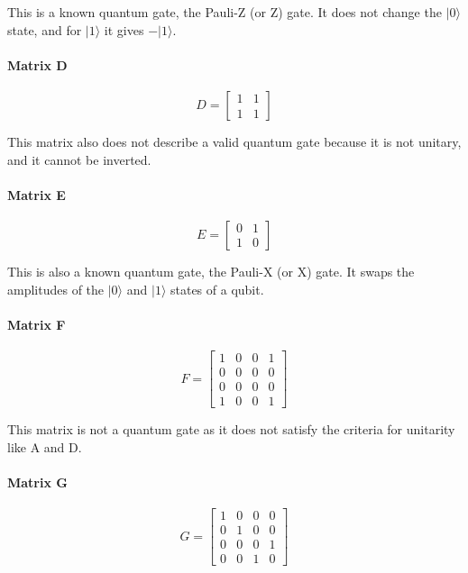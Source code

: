 \documentclass[12pt]{article}
\begin{document}
This is a known quantum gate, the Pauli-Z (or Z) gate. It does not change the $|0⟩$ state, and for $|1⟩$ it gives $-|1⟩$.

\paragraph*{Matrix D}

$$ D =
\begin{bmatrix}
    1 & 1 \\
    1 & 1
\end{bmatrix}
$$

This matrix also does not describe a valid quantum gate because it is not unitary, and it cannot be inverted.

\paragraph*{Matrix E}

$$ E =
\begin{bmatrix}
    0 & 1 \\
    1 & 0
\end{bmatrix}
$$

This is also a known quantum gate, the Pauli-X (or X) gate. It swaps the amplitudes of the $|0⟩$ and $|1⟩$ states of a qubit.

\paragraph*{Matrix F}

$$ F = 
\begin{bmatrix}
    1 & 0 & 0 & 1 \\
    0 & 0 & 0 & 0 \\
    0 & 0 & 0 & 0 \\
    1 & 0 & 0 & 1
\end{bmatrix}
$$ 

This matrix is not a quantum gate as it does not satisfy the criteria for unitarity like A and D.

\paragraph*{Matrix G}

$$ G =
\begin{bmatrix}
    1 & 0 & 0 & 0 \\
    0 & 1 & 0 & 0 \\
    0 & 0 & 0 & 1 \\
    0 & 0 & 1 & 0
\end{bmatrix}
$$
\end{document}
